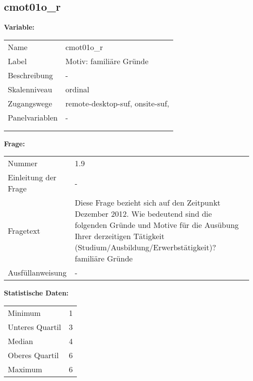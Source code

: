 	
	
	\subsection{cmot01o\_r}
	\label{subSection:cmot01o_r}

	\noindent\textbf{Variable:}\\
		\begin{tabular}{lL{11.3cm}}
			\label{tableVariable:cmot01o_r}
			Name & cmot01o\_r \\
			Label & Motiv: familiäre Gründe \\
			Beschreibung & - \\
			Skalenniveau & ordinal \\
			Zugangswege &
				remote-desktop-suf,
				onsite-suf,
 \\
			Panelvariablen & -
			 \\
			 \\
 \\
		\end{tabular}

		\vspace*{1 cm}
		\noindent\textbf{Frage:}\\
		\begin{tabular}{lL{11.3cm}}
			\label{tableQuestion:cmot01o_r}
			Nummer & 1.9 \\
			Einleitung der Frage & - \\
			Fragetext & Diese Frage bezieht sich auf den Zeitpunkt Dezember 2012. Wie bedeutend sind die folgenden Gründe und Motive für die Ausübung Ihrer derzeitigen Tätigkeit (Studium/Ausbildung/Erwerbstätigkeit)?
familiäre Gründe \\
			Ausfüllanweisung & - \\
		\end{tabular}


		\vspace*{1 cm}
		\noindent\textbf{Statistische Daten:}\\
			\begin{tabular}{ll}
				\label{tableStatistics:cmot01o_r}
					Minimum & 1 \\
					Unteres Quartil & 3 \\
					Median & 4 \\
					Oberes Quartil & 6 \\
					Maximum & 6 \\
			\end{tabular}



